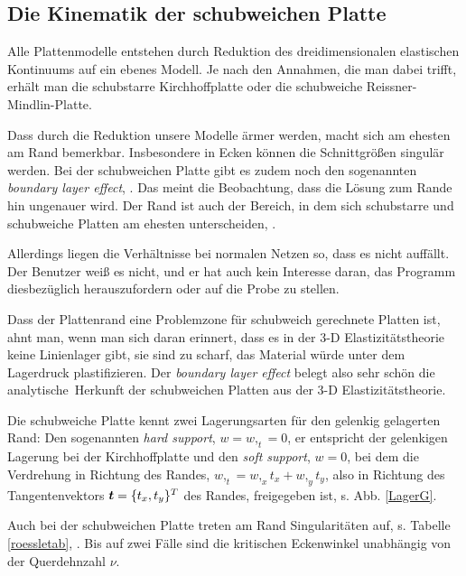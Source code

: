 {\textcolor{sectionTitleBlue}{\section{Die Kinematik der schubweichen Platte}}}
Alle Plattenmodelle entstehen durch Reduktion des dreidimensionalen elastischen Kontinuums auf ein ebenes Modell. Je nach den Annahmen, die man dabei trifft, erh\"{a}lt man die schubstarre Kirchhoffplatte oder die schubweiche Reissner-Mindlin-Platte.

Dass durch die Reduktion unsere Modelle \"{a}rmer werden, macht sich am ehesten am Rand bemerkbar. Insbesondere in Ecken k\"{o}nnen die Schnittgr\"{o}{\ss}en singul\"{a}r werden. Bei der schubweichen Platte gibt es zudem noch den sogenannten {\em boundary layer effect\/}, \cite{Szabo}. Das meint die Beobachtung, dass die L\"{o}sung zum Rande hin ungenauer wird. Der Rand ist auch der Bereich, in dem sich schubstarre und schubweiche Platten am ehesten unterscheiden, \cite{Szabo}.

Allerdings liegen die Verh\"{a}ltnisse bei normalen Netzen so, dass es nicht auff\"{a}llt. Der Benutzer wei{\ss} es nicht, und er hat auch kein Interesse daran, das Programm diesbez\"{u}glich herauszufordern oder auf die Probe zu stellen.

Dass der Plattenrand eine Problemzone f\"{u}r schubweich gerechnete Platten ist, ahnt man, wenn man sich daran erinnert, dass es in der 3-D Elastizit\"{a}tstheorie keine Linienlager gibt, sie sind \glq zu scharf\grq, das Material w\"{u}rde unter dem Lagerdruck plastifizieren. Der {\em boundary layer effect\/} belegt also sehr sch\"{o}n die \glq analytische\grq\ Herkunft der schubweichen Platten aus der 3-D Elastizit\"{a}tstheorie.

Die schubweiche Platte kennt zwei Lagerungsarten\label{Lagerungsarten} f\"{u}r den gelenkig gelagerten Rand: Den sogenannten {\em hard support\/}, $w = w,_t = 0$, er entspricht der gelenkigen Lagerung bei der Kirchhoffplatte und den {\em soft support\/}, $w = 0$, bei dem die Verdrehung in Richtung des Randes, $w,_t = w,_x  t_x + w,_y t_y$, also in Richtung des Tangentenvektors $\mbox{\boldmath $t$} = \{t_x,t_y\}^T$ des Randes, freigegeben ist, s. Abb. \ref{LagerG}.

Auch bei der schubweichen Platte treten am Rand Singularit\"{a}ten auf, s. Tabelle \ref{roessletab}, \cite{Roessle}. Bis auf zwei F\"{a}lle sind die kritischen Eckenwinkel unabh\"{a}ngig von der Querdehnzahl $\nu$.

